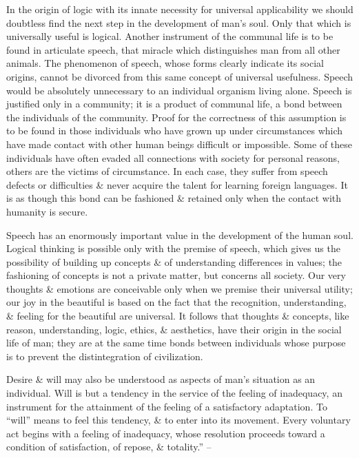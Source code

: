 \documentclass{article}
\begin{document}
In the origin of logic with its innate necessity for universal applicability we should doubtless find the next step in the development of man's soul. Only that which is universally useful is logical. Another instrument of the communal life is to be found in articulate speech, that miracle which distinguishes man from all other animals. The phenomenon of speech, whose forms clearly indicate its social origins, cannot be divorced from this same concept of universal usefulness. Speech would be absolutely unnecessary to an individual organism living alone. Speech is justified only in a community; it is a product of communal life, a bond between the individuals of the community. Proof for the correctness of this assumption is to be found in those individuals who have grown up under circumstances which have made contact with other human beings difficult or impossible. Some of these individuals have often evaded all connections with society for personal reasons, others are the victims of circumstance. In each case, they suffer from speech defects or difficulties \& never acquire the talent for learning foreign languages. It is as though this bond can be fashioned \& retained only when the contact with humanity is secure.

Speech has an enormously important value in the development of the human soul. Logical thinking is possible only with the premise of speech, which gives us the possibility of building up concepts \& of understanding differences in values; the fashioning of concepts is not a private matter, but concerns all society. Our very thoughts \& emotions are conceivable only when we premise their universal utility; our joy in the beautiful is based on the fact that the recognition, understanding, \& feeling for the beautiful are universal. It follows that thoughts \& concepts, like reason, understanding, logic, ethics, \& aesthetics, have their origin in the social life of man; they are at the same time bonds between individuals whose purpose is to prevent the distintegration of civilization.

Desire \& will may also be understood as aspects of man's situation as an individual. Will is but a tendency in the service of the feeling of inadequacy, an instrument for the attainment of the feeling of a satisfactory adaptation. To ``will'' means to feel this tendency, \& to enter into its movement. Every voluntary act begins with a feeling of inadequacy, whose resolution proceeds toward a condition of satisfaction, of repose, \& totality.'' -- \cite[pp. 29--31]{Adler_human_nature}
\end{document}
